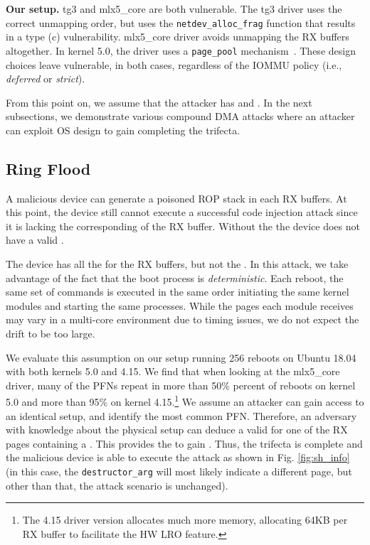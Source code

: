 \smallskip
\noindent\textbf{Our setup.} tg3 and mlx5\_core are both vulnerable. The tg3 driver uses the correct unmapping order, but uses the \texttt{netdev\_alloc\_frag} function that results in a type (c) \subpage{} vulnerability. mlx5\_core driver avoids unmapping the RX buffers altogether. In kernel 5.0, the driver uses a \texttt{page\_pool} mechanism~\cite{page_pool}. These design choices leave \shinfo{} vulnerable, in both cases, regardless of the IOMMU policy (i.e., \emph{deferred} or \emph{strict}).


From this point on, we assume that the attacker has \means and \oportunity{}. In the next subsections, we demonstrate various compound DMA attacks where an attacker can exploit OS design to gain \motivation{} completing the trifecta.

\subsection{Ring Flood}\label{sec:ringflod}
A malicious device can generate a poisoned ROP stack in each RX buffers. At this point, the device still cannot execute a successful code injection attack since it is lacking the corresponding \kva of the RX buffer. Without the \kva the device does not have a valid \motivation.

The device has all the \iova{} for the RX buffers, but not the \kva{}. In this attack, we take advantage of the fact that the boot process is \emph{deterministic}. Each reboot, the same set of commands is executed in the same order initiating the same kernel modules and starting the same processes. While the pages each module receives may vary in a multi-core environment due to timing issues, we do not expect the drift to be too large. 

We evaluate this assumption on our setup running 256 reboots on Ubuntu 18.04 with both kernels 5.0 and 4.15.
We find that when looking at the mlx5\_core driver, many of the PFNs repeat in more than 50\% percent of reboots on kernel 5.0 and more than 95\% on kernel 4.15.\footnote{The 4.15 driver version allocates much more memory, allocating 64KB per RX buffer to facilitate the HW LRO feature.} We assume an attacker can gain access to an identical setup, and identify the most common PFN. Therefore, an adversary with knowledge about the physical setup can deduce a valid \kva{} for one of the RX pages containing a \mabaf. This provides the \kva to gain \motivation{}. Thus, the trifecta is complete and the malicious device is able to execute the attack as shown in Fig. \ref{fig:sh_info} (in this case, the \texttt{destructor\_arg} will most likely indicate a different page, but other than that, the attack scenario is unchanged).


